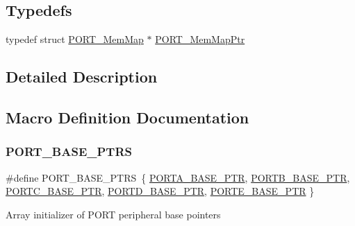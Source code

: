 \subsection*{Typedefs}
\begin{DoxyCompactItemize}
\item 
typedef struct \hyperlink{struct_p_o_r_t___mem_map}{P\+O\+R\+T\+\_\+\+Mem\+Map} $\ast$ \hyperlink{group___p_o_r_t___peripheral_ga0e26bafb7c17808f90278627bcbcaf8c}{P\+O\+R\+T\+\_\+\+Mem\+Map\+Ptr}
\end{DoxyCompactItemize}


\subsection{Detailed Description}


\subsection{Macro Definition Documentation}
\mbox{\label{group___p_o_r_t___peripheral_ga54ff5179f8acaef2e1683cedfc0ef453}} 
\subsubsection{\texorpdfstring{P\+O\+R\+T\+\_\+\+B\+A\+S\+E\+\_\+\+P\+T\+RS}{PORT\_BASE\_PTRS}}
{\footnotesize\ttfamily \#define P\+O\+R\+T\+\_\+\+B\+A\+S\+E\+\_\+\+P\+T\+RS~\{ \hyperlink{group___p_o_r_t___peripheral_gaa18ec7594fe603225220ec6eda4a19ce}{P\+O\+R\+T\+A\+\_\+\+B\+A\+S\+E\+\_\+\+P\+TR}, \hyperlink{group___p_o_r_t___peripheral_ga585b4782d1ceb44492289af0019480f9}{P\+O\+R\+T\+B\+\_\+\+B\+A\+S\+E\+\_\+\+P\+TR}, \hyperlink{group___p_o_r_t___peripheral_ga03c740cdda17711afafc932723871474}{P\+O\+R\+T\+C\+\_\+\+B\+A\+S\+E\+\_\+\+P\+TR}, \hyperlink{group___p_o_r_t___peripheral_ga7f5a263751543810ebfdbde278383276}{P\+O\+R\+T\+D\+\_\+\+B\+A\+S\+E\+\_\+\+P\+TR}, \hyperlink{group___p_o_r_t___peripheral_gab166fe285bbb15b52de610f408fe25d3}{P\+O\+R\+T\+E\+\_\+\+B\+A\+S\+E\+\_\+\+P\+TR} \}}

Array initializer of P\+O\+RT peripheral base pointers \mbox{\label{group___p_o_r_t___peripheral_gaa18ec7594fe603225220ec6eda4a19ce}} 
